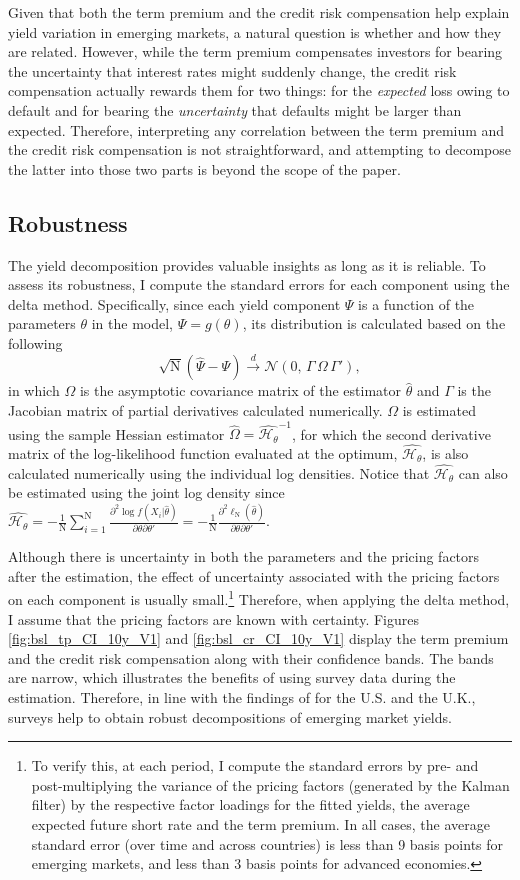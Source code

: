 \documentclass[a4paper, 12pt]{article}
\providecommand{\Ydim}{\mathrm{N}}
\providecommand{\Normal}{\mathcal{N}}
\providecommand{\params}{\theta}
\providecommand{\Vasy}{\Omega}
\providecommand{\cmpnt}{\Psi}
\providecommand{\Jacobian}{\Gamma}
\providecommand{\Hessian}{\mathcal{H}_\params}
\providecommand{\asydstr}{\sqrt{\Ydim} \left( \widehat{\cmpnt} - \cmpnt \right) \xrightarrow[]{d} \Normal \left(0,\, \Jacobian \, \Vasy \, \Jacobian' \right)}
\providecommand{\sampleHjoint}{\frac{1}{\Ydim} \frac{\partial^{2} \ell_{\Ydim} (\widehat{\params})}{\partial \params \partial \params'}}
\providecommand{\sampleHindiv}{\frac{1}{\Ydim} \sum_{i = 1}^{\Ydim} \frac{\partial^{2} \log \mathit{f} (X_{i} | \widehat{\params})}{\partial \params \partial \params'}}
\begin{document}
\begin{appendices}
	Given that both the term premium and the credit risk compensation help explain yield variation in emerging markets, a natural question is whether and how they are related. However, while the term premium compensates investors for bearing the uncertainty that interest rates might suddenly change, the credit risk compensation actually rewards them for two things: for the \textit{expected} loss owing to default and for bearing the \textit{uncertainty} that defaults might be larger than expected. Therefore, interpreting any correlation between the term premium and the credit risk compensation is not straightforward, and attempting to decompose the latter into those two parts is beyond the scope of the paper. 
	
	\subsection{Robustness}
	The yield decomposition provides valuable insights as long as it is reliable. To assess its robustness, I compute the standard errors for each component using the delta method. Specifically, since each yield component \(\cmpnt\) is a function of the parameters \(\theta\) in the model, \(\cmpnt = g(\params) \), its distribution is calculated based on the following
	\begin{equation*}
	\asydstr ,
	\end{equation*}
	\noindent in which \(\Vasy\) is the asymptotic covariance matrix of the estimator \(\widehat{\params}\) and \(\Jacobian\) is the Jacobian matrix of partial derivatives calculated numerically. \(\Vasy\) is estimated using the sample Hessian estimator \(\widehat{\Vasy} = \widehat{\Hessian}^{-1} \), for which the second derivative matrix of the log-likelihood function evaluated at the optimum, \(\widehat{\Hessian}\), is also calculated numerically using the individual log densities. Notice that \(\widehat{\Hessian}\) can also be estimated using the joint log density since \(\widehat{\Hessian} = - \sampleHindiv = - \sampleHjoint\). 
	
	Although there is uncertainty in both the parameters and the pricing factors after the estimation, the effect of uncertainty associated with the pricing factors on each component is usually small.\footnote{ To verify this, at each period, I compute the standard errors by pre- and post-multiplying the variance of the pricing factors (generated by the Kalman filter) by the respective factor loadings for the fitted yields, the average expected future short rate and the term premium. In all cases, the average standard error (over time and across countries) is less than 9 basis points for emerging markets, and less than 3 basis points for advanced economies.} Therefore, when applying the delta method, I assume that the pricing factors are known with certainty. Figures \ref{fig:bsl_tp_CI_10y_V1} and \ref{fig:bsl_cr_CI_10y_V1} display the term premium and the credit risk compensation along with their confidence bands. The bands are narrow, which illustrates the benefits of using survey data during the estimation. Therefore, in line with the findings of \cite{Guimaraes:2014} for the U.S. and the U.K., surveys help to obtain robust decompositions of emerging market yields.
	

\end{appendices}
\end{document}
